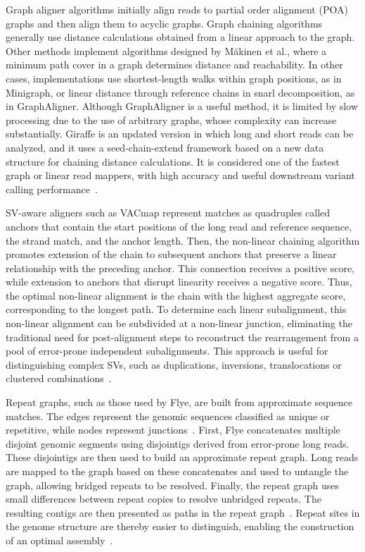 \documentclass[12pt, letterpaper]{article}
\begin{document}
Graph aligner algorithms initially align reads to partial order alignment (POA) graphs and then align them to acyclic graphs. Graph chaining algorithms generally use distance calculations obtained from a linear approach to the graph. Other methods implement algorithms designed by Mäkinen et al., where a minimum path cover in a graph determines distance and reachability. In other cases, implementations use shortest-length walks within graph positions, as in Minigraph, or linear distance through reference chains in snarl decomposition, as in GraphAligner. Although GraphAligner is a useful method, it is limited by slow processing due to the use of arbitrary graphs, whose complexity can increase substantially. Giraffe is an updated version in which long and short reads can be analyzed, and it uses a seed-chain-extend framework based on a new data structure for chaining distance calculations. It is considered one of the fastest graph or linear read mappers, with high accuracy and useful downstream variant calling performance~\cite{Chang2025}.

SV-aware aligners such as VACmap represent matches as quadruples called anchors that contain the start positions of the long read and reference sequence, the strand match, and the anchor length. Then, the non-linear chaining algorithm promotes extension of the chain to subsequent anchors that preserve a linear relationship with the preceding anchor. This connection receives a positive score, while extension to anchors that disrupt linearity receives a negative score. Thus, the optimal non-linear alignment is the chain with the highest aggregate score, corresponding to the longest path. To determine each linear subalignment, this non-linear alignment can be subdivided at a non-linear junction, eliminating the traditional need for post-alignment steps to reconstruct the rearrangement from a pool of error-prone independent subalignments. This approach is useful for distinguishing complex SVs, such as duplications, inversions, translocations or clustered combinations~\cite{vacmap2025,Mahmoud2025}.


Repeat graphs, such as those used by Flye, are built from approximate sequence matches. The edges represent the genomic sequences classified as unique or repetitive, while nodes represent junctions~\cite{Kolmogorov2020}. First, Flye concatenates multiple disjoint genomic segments using disjointigs derived from error-prone long reads. These disjointigs are then used to build an approximate repeat graph. Long reads are mapped to the graph based on these concatenates and used to untangle the graph, allowing bridged repeats to be resolved. Finally, the repeat graph uses small differences between repeat copies to resolve unbridged repeats. The resulting contigs are then presented as paths in the repeat graph~\cite{Kolmogorov2019}. Repeat sites in the genome structure are thereby easier to distinguish, enabling the construction of an optimal assembly~\cite{Kolmogorov2020}.
\end{document}
